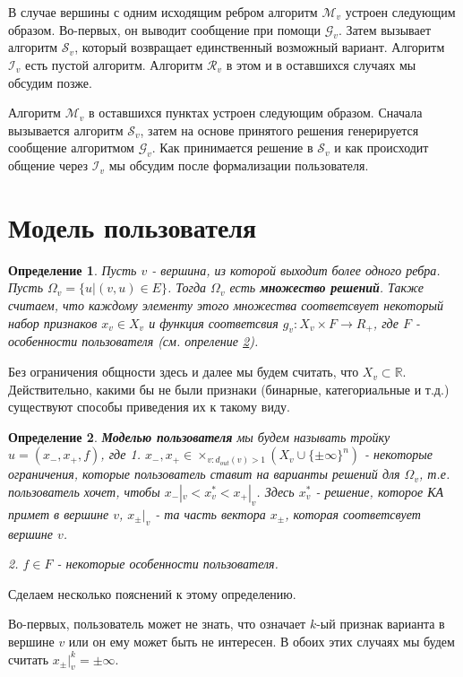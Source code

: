 \documentclass[12pt]{article}
\newtheorem{defin}{Определение}[section]
\begin{document}
В случае вершины с одним исходящим ребром алгоритм $\mathcal{M}_v$ устроен следующим образом. Во-первых, он выводит сообщение при помощи $\mathcal{G}_v$. Затем вызывает алгоритм $\mathcal{S}_v$, который возвращает единственный возможный вариант. Алгоритм $\mathcal{I}_v$ есть пустой алгоритм. Алгоритм $\mathcal{R}_v$ в этом и в оставшихся случаях мы обсудим позже.

Алгоритм $\mathcal{M}_v$ в оставшихся пунктах устроен следующим образом. Сначала вызывается алгоритм $\mathcal{S}_v$, затем на основе принятого решения генерируется сообщение алгоритмом $\mathcal{G}_v$. Как принимается решение в $\mathcal{S}_v$ и как происходит общение через $\mathcal{I}_v$ мы обсудим после формализации пользователя.

\section{Модель пользователя}

\begin{defin}
Пусть $v$ - вершина, из которой выходит более одного ребра. Пусть $\Omega_v = \{u|(v,u)\in E\}$. Тогда $\Omega_v$ есть \textbf{множество решений}. Также считаем, что каждому элементу этого множества соответсвует некоторый набор признаков $x_v \in X_v$ и функция соответсвия $g_v:X_v\times F \rightarrow R_+$, где $F$ - особенности пользователя (см. опреление \ref{user_def}).
\end{defin}

Без ограничения общности здесь и далее мы будем считать, что $X_v \subset \mathbb{R}$. Действительно, какими бы не были признаки (бинарные, категориальные и т.д.) существуют способы приведения их к такому виду.

\begin{defin}
\label{user_def}
\textbf{Моделью пользователя} мы будем называть тройку $u = (x_-, x_+, f)$, где
1. $x_-, x_+\in \times_{v:d_{out}(v)>1} (X_v\cup \{\pm \infty\}^n)$ - некоторые ограничения, которые пользователь ставит на варианты решений для $\Omega_v$, т.е. пользователь хочет, чтобы $x_-|_v < x_v^* <x_+|_v$. Здесь $x_v^*$ - решение, которое КА примет в вершине $v$, $x_\pm|_v$ - та часть вектора $x_\pm$, которая соответсвует вершине $v$.

2. $f\in F$ - некоторые особенности пользователя.
\end{defin}

Сделаем несколько пояснений к этому определению.

Во-первых, пользователь может не знать, что означает $k$-ый признак варианта в вершине $v$ или он ему может быть не интересен. В обоих этих случаях мы будем считать $x_\pm|_v^k = \pm\infty$.
\end{document}
